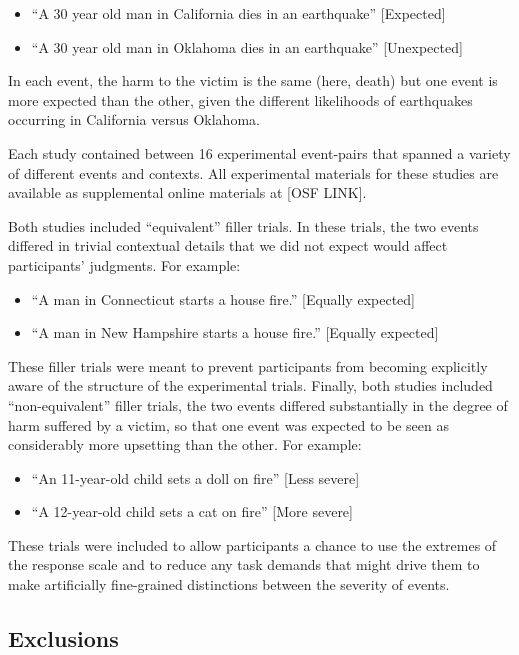 \documentclass[]{article}
\begin{document}
\begin{itemize}
\item
  ``A 30 year old man in California dies in an earthquake''
  {[}Expected{]}
\item
  ``A 30 year old man in Oklahoma dies in an earthquake''
  {[}Unexpected{]}
\end{itemize}

In each event, the harm to the victim is the same (here, death) but one
event is more expected than the other, given the different likelihoods
of earthquakes occurring in California versus Oklahoma.

Each study contained between 16 experimental event-pairs that spanned a
variety of different events and contexts. All experimental materials for
these studies are available as supplemental online materials at {[}OSF
LINK{]}.

Both studies included ``equivalent'' filler trials. In these trials, the
two events differed in trivial contextual details that we did not expect
would affect participants' judgments. For example:

\begin{itemize}
\item
  ``A man in Connecticut starts a house fire.'' {[}Equally expected{]}
\item
  ``A man in New Hampshire starts a house fire.'' {[}Equally expected{]}
\end{itemize}

These filler trials were meant to prevent participants from becoming
explicitly aware of the structure of the experimental trials. Finally,
both studies included ``non-equivalent'' filler trials, the two events
differed substantially in the degree of harm suffered by a victim, so
that one event was expected to be seen as considerably more upsetting
than the other. For example:

\begin{itemize}
\item
  ``An 11-year-old child sets a doll on fire'' {[}Less severe{]}
\item
  ``A 12-year-old child sets a cat on fire'' {[}More severe{]}
\end{itemize}

These trials were included to allow participants a chance to use the
extremes of the response scale and to reduce any task demands that might
drive them to make artificially fine-grained distinctions between the
severity of events.

\subsection{Exclusions}\label{exclusions}
\end{document}
